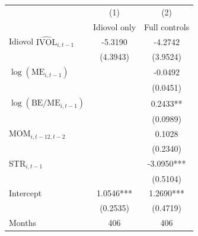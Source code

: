 \begin{tabular}{lcc}
\toprule
 & (1) & (2) \\
 & Idiovol only & Full controls \\
\midrule
Idiovol $\widehat{\mathrm{IVOL}}_{i,t-1}$ & -5.3190 & -4.2742 \\
 & (4.3943) & (3.9524) \\
$\log(\mathrm{ME}_{i,t-1})$ &  & -0.0492 \\
 &  & (0.0451) \\
$\log(\mathrm{BE}/\mathrm{ME}_{i,t-1})$ &  & 0.2433** \\
 &  & (0.0989) \\
MOM$_{i,t-12,t-2}$ &  & 0.1028 \\
 &  & (0.2340) \\
STR$_{i,t-1}$ &  & -3.0950*** \\
 &  & (0.5104) \\
Intercept & 1.0546*** & 1.2690*** \\
 & (0.2535) & (0.4719) \\
\midrule
Months & 406 & 406 \\
\bottomrule
\end{tabular}
